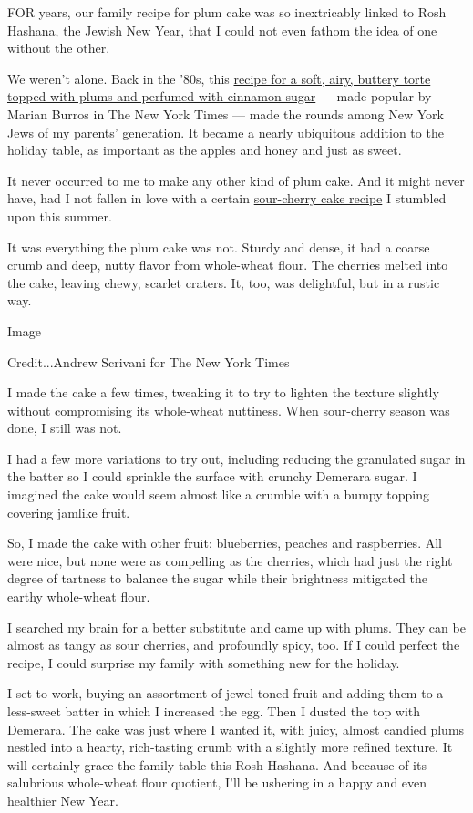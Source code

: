 FOR years, our family recipe for plum cake was so inextricably linked to
Rosh Hashana, the Jewish New Year, that I could not even fathom the idea
of one without the other.

We weren't alone. Back in the '80s, this
\href{http://events.nytimes3xbfgragh.onion/recipes/3783/1991/09/04/Original-Plum-Torte/recipe.html?scp=1\&sq=marian\%20burros\%20and\%20plum\%20cake\&st=cse}{recipe
for a soft, airy, buttery torte topped with plums and perfumed with
cinnamon sugar} --- made popular by Marian Burros in The New York Times
--- made the rounds among New York Jews of my parents' generation. It
became a nearly ubiquitous addition to the holiday table, as important
as the apples and honey and just as sweet.

It never occurred to me to make any other kind of plum cake. And it
might never have, had I not fallen in love with a certain
\href{http://www.saveur.com/article/Recipes/Hungarian-Sour-Cherry-Cake}{sour-cherry
cake recipe} I stumbled upon this summer.

It was everything the plum cake was not. Sturdy and dense, it had a
coarse crumb and deep, nutty flavor from whole-wheat flour. The cherries
melted into the cake, leaving chewy, scarlet craters. It, too, was
delightful, but in a rustic way.

Image

Credit...Andrew Scrivani for The New York Times

I made the cake a few times, tweaking it to try to lighten the texture
slightly without compromising its whole-wheat nuttiness. When
sour-cherry season was done, I still was not.

I had a few more variations to try out, including reducing the
granulated sugar in the batter so I could sprinkle the surface with
crunchy Demerara sugar. I imagined the cake would seem almost like a
crumble with a bumpy topping covering jamlike fruit.

So, I made the cake with other fruit: blueberries, peaches and
raspberries. All were nice, but none were as compelling as the cherries,
which had just the right degree of tartness to balance the sugar while
their brightness mitigated the earthy whole-wheat flour.

I searched my brain for a better substitute and came up with plums. They
can be almost as tangy as sour cherries, and profoundly spicy, too. If I
could perfect the recipe, I could surprise my family with something new
for the holiday.

I set to work, buying an assortment of jewel-toned fruit and adding them
to a less-sweet batter in which I increased the egg. Then I dusted the
top with Demerara. The cake was just where I wanted it, with juicy,
almost candied plums nestled into a hearty, rich-tasting crumb with a
slightly more refined texture. It will certainly grace the family table
this Rosh Hashana. And because of its salubrious whole-wheat flour
quotient, I'll be ushering in a happy and even healthier New Year.

